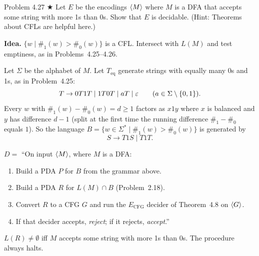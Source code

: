\begin{question}{Problem 4.27 $\bigstar$}
Let $E$ be the encodings $\langle M\rangle$ where $M$ is a DFA that accepts some string with more 1s than 0s. Show that $E$ is decidable. (Hint: Theorems about CFLs are helpful here.)
\end{question}
\begin{soln}
\textbf{Idea.} $\{w\mid \#_1(w)>\#_0(w)\}$ is a CFL. Intersect with $L(M)$ and test emptiness, as in Problems~4.25--4.26.

Let $\Sigma$ be the alphabet of $M$. Let $T_{\mathrm{eq}}$ generate strings with equally many 0s and 1s, as in Problem~4.25:
\[
T\to 0T1T \mid 1T0T \mid aT \mid \varepsilon \qquad(a\in\Sigma\setminus\{0,1\}).
\]
Every $w$ with $\#_1(w)-\#_0(w)=d\ge 1$ factors as $x1y$ where $x$ is balanced and $y$ has difference $d-1$ (split at the first time the running difference $\#_1-\#_0$ equals $1$). So the language $B=\{w\in\Sigma^*\mid \#_1(w)>\#_0(w)\}$ is generated by
\[
S\to T1S \mid T1T.
\]

$D=$ ``On input $\langle M\rangle$, where $M$ is a DFA:
\begin{enumerate}
\item Build a PDA $P$ for $B$ from the grammar above.
\item Build a PDA $R$ for $L(M)\cap B$ (Problem~2.18).
\item Convert $R$ to a CFG $G$ and run the $E_{\mathrm{CFG}}$ decider of Theorem~4.8 on $\langle G\rangle$.
\item If that decider accepts, \emph{reject}; if it rejects, \emph{accept}.''
\end{enumerate}
$L(R)\neq\emptyset$ iff $M$ accepts some string with more 1s than 0s. The procedure always halts.
\end{soln}

